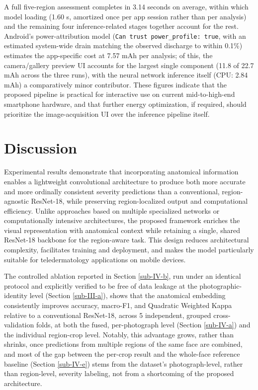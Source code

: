 \documentclass[conference]{IEEEtran}
\begin{document}
A full five-region assessment completes in 3.14 seconds on average, within which model loading (1.60 s, amortized once per app session rather than per analysis) and the remaining four inference-related stages together account for the rest. Android's power-attribution model (\texttt{Can trust power\_profile: true}, with an estimated system-wide drain matching the observed discharge to within 0.1\%) estimates the app-specific cost at 7.57 mAh per analysis; of this, the camera/gallery preview UI accounts for the largest single component (11.8 of 22.7 mAh across the three runs), with the neural network inference itself (CPU: 2.84 mAh) a comparatively minor contributor. These figures indicate that the proposed pipeline is practical for interactive use on current mid-to-high-end smartphone hardware, and that further energy optimization, if required, should prioritize the image-acquisition UI over the inference pipeline itself.


\FloatBarrier
\section{Discussion}
Experimental results demonstrate that incorporating anatomical information enables a lightweight convolutional architecture to produce both more accurate and more ordinally consistent severity predictions than a conventional, region-agnostic ResNet-18, while preserving region-localized output and computational efficiency. Unlike approaches based on multiple specialized networks or computationally intensive architectures, the proposed framework enriches the visual representation with anatomical context while retaining a single, shared ResNet-18 backbone for the region-aware task. This design reduces architectural complexity, facilitates training and deployment, and makes the model particularly suitable for teledermatology applications on mobile devices.

The controlled ablation reported in Section \ref{sub-IV-b}, run under an identical protocol and explicitly verified to be free of data leakage at the photographic-identity level (Section \ref{sub-III-a}), shows that the anatomical embedding consistently improves accuracy, macro-F1, and Quadratic Weighted Kappa relative to a conventional ResNet-18, across 5 independent, grouped cross-validation folds, at both the fused, per-photograph level (Section \ref{sub-IV-a}) and the individual region-crop level. Notably, this advantage grows, rather than shrinks, once predictions from multiple regions of the same face are combined, and most of the gap between the per-crop result and the whole-face reference baseline (Section \ref{sub-IV-e}) stems from the dataset's photograph-level, rather than region-level, severity labeling, not from a shortcoming of the proposed architecture.
\end{document}
